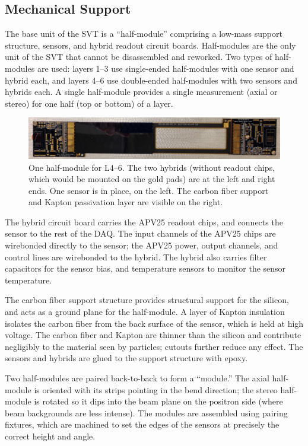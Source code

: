 \subsection{Mechanical Support}
\label{sec:svt_mechanical}

The base unit of the SVT is a ``half-module'' comprising a low-mass support structure, sensors, and hybrid readout circuit boards.
Half-modules are the only unit of the SVT that cannot be disassembled and reworked.
Two types of half-modules are used: layers 1--3 use single-ended half-modules with one sensor and hybrid each, and layers 4--6 use double-ended half-modules with two sensors and hybrids each.
A single half-module provides a single measurement (axial or stereo) for one half (top or bottom) of a layer.

\begin{figure}[htp]
    \includegraphics[width=\textwidth]{detector/figs/l456_hm}
    \caption{One half-module for L4--6. The two hybrids (without readout chips, which would be mounted on the gold pads) are at the left and right ends. One sensor is in place, on the left. The carbon fiber support and Kapton passivation layer are visible on the right.}
    \label{fig:l456_hm}
\end{figure}

The hybrid circuit board carries the APV25 readout chips, and connects the sensor to the rest of the DAQ.
The input channels of the APV25 chips are wirebonded directly to the sensor; the APV25 power, output channels, and control lines are wirebonded to the hybrid.
The hybrid also carries filter capacitors for the sensor bias, and temperature sensors to monitor the sensor temperature.

The carbon fiber support structure provides structural support for the silicon, and acts as a ground plane for the half-module.
A layer of Kapton insulation isolates the carbon fiber from the back surface of the sensor, which is held at high voltage.
The carbon fiber and Kapton are thinner than the silicon and contribute negligibly to the material seen by particles; cutouts further reduce any effect.
The sensors and hybrids are glued to the support structure with epoxy.

Two half-modules are paired back-to-back to form a ``module.''
The axial half-module is oriented with its strips pointing in the bend direction; the stereo half-module is rotated so it dips into the beam plane on the positron side (where beam backgrounds are less intense).
The modules are assembled using pairing fixtures, which are machined to set the edges of the sensors at precisely the correct height and angle.

